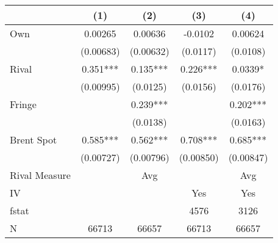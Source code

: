 {
\def\sym#1{\ifmmode^{#1}\else\(^{#1}\)\fi}
\begin{tabular}{l*{4}{c}}
\toprule
                &\multicolumn{1}{c}{(1)}   &\multicolumn{1}{c}{(2)}   &\multicolumn{1}{c}{(3)}   &\multicolumn{1}{c}{(4)}   \\
\midrule
Own             &  0.00265   &  0.00636   &  -0.0102   &  0.00624   \\
                &(0.00683)   &(0.00632)   & (0.0117)   & (0.0108)   \\
\addlinespace
Rival           &    0.351***&    0.135***&    0.226***&   0.0339*  \\
                &(0.00995)   & (0.0125)   & (0.0156)   & (0.0176)   \\
\addlinespace
Fringe          &            &    0.239***&            &    0.202***\\
                &            & (0.0138)   &            & (0.0163)   \\
\addlinespace
Brent Spot      &    0.585***&    0.562***&    0.708***&    0.685***\\
                &(0.00727)   &(0.00796)   &(0.00850)   &(0.00847)   \\
\midrule
Rival Measure   &            &      Avg   &            &      Avg   \\
IV              &            &            &      Yes   &      Yes   \\
fstat           &            &            &     4576   &     3126   \\
N               &    66713   &    66657   &    66713   &    66657   \\
\bottomrule
\end{tabular}
}
